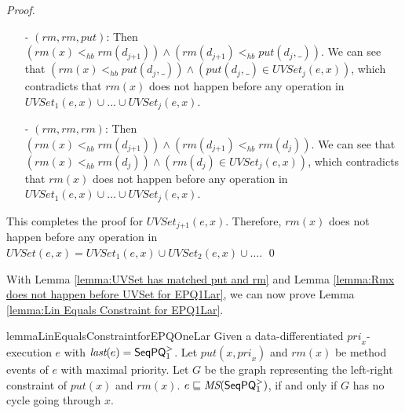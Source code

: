 \begin {proof}
\begin{itemize}
\begin{itemize}
    \item[-] If $\textit{put}(d_{\textit{ind}},\_) <_{hb} \textit{rm}(d_{\textit{ind-1}})$, then we obtain $T_{\textit{ind-1}}$, which already contain contradiction.
    \end{itemize}

    By base case $1$, base case $2$ and the induction step, it is easy to see that for each $i$, $T_i$ contains contradiction. Therefore, $T_j$, the case of $(\textit{rm},\textit{put},\textit{rm})$, contains contradiction.

\item[-] $(\textit{rm},\textit{rm},\textit{put})$: Then $( \textit{rm}(x) <_{hb} \textit{rm}(d_{\textit{j+1}}) ) \wedge ( \textit{rm}(d_{\textit{j+1}}) <_{hb} \textit{put}(d_j,\_) )$. We can see that $( \textit{rm}(x) <_{hb} \textit{put}(d_j,\_) ) \wedge ( \textit{put}(d_j,\_) \in \textit{UVSet}_j(e,x) )$, which contradicts that $\textit{rm}(x)$ does not happen before any operation in $\textit{UVSet}_1(e,x) \cup \ldots \cup \textit{UVSet}_j(e,x)$.

\item[-] $(\textit{rm},\textit{rm},\textit{rm})$: Then $( \textit{rm}(x) <_{hb} \textit{rm}(d_{\textit{j+1}}) ) \wedge ( \textit{rm}(d_{\textit{j+1}}) <_{hb} \textit{rm}(d_j) )$. We can see that $( \textit{rm}(x) <_{hb} \textit{rm}(d_j) ) \wedge ( \textit{rm}(d_j) \in \textit{UVSet}_j(e,x) )$, which contradicts that $\textit{rm}(x)$ does not happen before any operation in $\textit{UVSet}_1(e,x) \cup \ldots \cup \textit{UVSet}_j(e,x)$.
\end{itemize}

This completes the proof for $\textit{UVSet}_{\textit{j+1}}(e,x)$. Therefore, $\textit{rm}(x)$ does not happen before any operation in $\textit{UVSet}(e,x) = \textit{UVSet}_1(e,x) \cup \textit{UVSet}_2(e,x) \cup \ldots$. \qed
\end {proof}

With Lemma \ref{lemma:UVSet has matched put and rm} and Lemma \ref{lemma:Rmx does not happen before UVSet for EPQ1Lar}, we can now prove Lemma \ref{lemma:Lin Equals Constraint for EPQ1Lar}.

\begin{restatable}{lemma}{LinEqualsConstraintforEPQOneLar}
\label{lemma:Lin Equals Constraint for EPQ1Lar}
Given a data-differentiated $\textit{pri}_x$-execution $e$ with $\textit{last}(e) = \mathsf{SeqPQ}_1^{>}$. Let $\textit{put}(x,\textit{pri}_x)$ and $\textit{rm}(x)$ be method events of $e$ with maximal priority. Let $G$ be the graph representing the left-right constraint of $\textit{put}(x)$ and $\textit{rm}(x)$. $e \sqsubseteq \textit{MS}(\mathsf{SeqPQ}_1^{>})$, if and only if $G$ has no cycle going through $x$.
\end{restatable}

